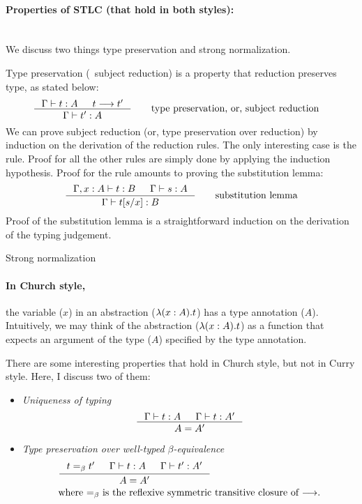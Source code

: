 \paragraph{Properties of STLC (that hold in both styles):}~\\
We discuss two things type preservation and strong normalization.

Type preservation (\aka\ subject reduction) is a property
that reduction preserves type, as stated below:
\begin{align*}
\inference{\Gamma |- t : A  & t --> t'}{\Gamma |- t' : A}
 &\qquad \text{type preservation, or, subject reduction}
\end{align*}
We can prove subject reduction (or, type preservation over reduction) by
induction on the derivation of the reduction rules. The only interesting case
is the  rule. Proof for all the other rules are simply done
by applying the induction hypothesis. Proof for the  rule
amounts to proving the substitution lemma:
\[ \inference{\Gamma,x:A |- t : B  & \Gamma |- s : A}{\Gamma |- t[s/x] : B}
   \qquad \text{substitution lemma} \]
Proof of the substitution lemma is a straightforward induction on
the derivation of the typing judgement.

Strong normalization 

\paragraph{In Church style,} the variable ($x$) in an abstraction
($\lambda(x:A).t$) has a type annotation ($A$). Intuitively, we may think of
the abstraction ($\lambda(x:A).t$) as a function that expects an argument of
the type ($A$) specified by the type annotation.

There are some interesting properties that hold in Church style,
but not in Curry style. Here, I discuss two of them:
\begin{itemize}
\item \emph{Uniqueness of typing}
\[ \inference{\Gamma |- t : A & \Gamma |- t : A'}{A = A'} \]

\item \emph{Type preservation over well-typed $\beta$-equivalence}
\begin{align*}
& \inference{t =_{\beta} t' & \Gamma |- t : A & \Gamma |- t' : A'}{A = A'} \\
& \text{where $=_{\beta}$ is the reflexive symmetric transitive closure of $-->$.}
\end{align*}
\end{itemize}

